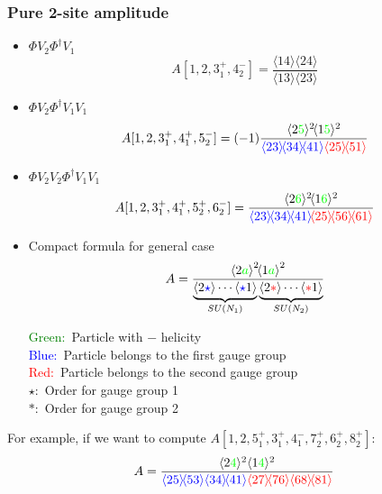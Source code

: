 \documentclass{beamer}
\newcommand{\avg}[1]{\langle #1 \rangle}
\newcommand{\mdavg}[2]{\langle #1 \rangle\!\langle #2 \rangle}
\newcommand{\asqu}[1]{{\langle#1\rangle}^2}
\begin{document}
\begin{frame}
    \frametitle{Pure 2-site amplitude}
    \begin{itemize}
        \item $\Phi V_2 \Phi^\dagger V_1$
        \begin{equation*}
            A[1,2,3_1^+,4_2^-]=\frac{\mdavg{14}{24}}{\mdavg{13}{23}}
        \end{equation*}
        \item $\Phi V_2 \Phi^\dagger V_1V_1$
        \begin{equation*}
            A[1,2,3_1^+,4_1^+,5_2^-]=(-1)\frac{\avg{2\textcolor{green}{5}}^2\!\avg{1\textcolor{green}{5}}^2}{\textcolor{blue}{\mdavg{23}{34}\!\avg{41}}\textcolor{red}{\mdavg{25}{51}}}
        \end{equation*}
        \item $\Phi V_2V_2 \Phi^\dagger V_1V_1$
        \begin{equation*}
            A[1,2,3_1^+,4_1^+,5_2^+,6_2^-]=\frac{\avg{2\textcolor{green}{6}}^2\!\avg{1\textcolor{green}{6}}^2}{\textcolor{blue}{\mdavg{23}{34}\!\avg{41}}\!\textcolor{red}{\mdavg{25}{56}\!\avg{61}}}
        \end{equation*}       
    \end{itemize}
\end{frame}

\begin{frame}
    \begin{itemize}
        \item Compact formula for general case
        \begin{equation*}
            A=\frac{\asqu{2\textcolor{green}{a}}\!\asqu{1\textcolor{green}{a}}}{\underbrace{\avg{2\textcolor{blue}{\star}}\cdots \avg{\textcolor{blue}{\star}1}}_{SU(N_1)}\underbrace{\avg{2\textcolor{red}{\ast} }\cdots \avg{\textcolor{red}{\ast} 1}}_{SU(N_2)}}
        \end{equation*} 
        \begin{minipage}{0.7\textwidth}
            \raggedright  %
            \textcolor{green}{Green:} \,Particle with $-$ helicity\\
            \textcolor{blue}{Blue:}\, Particle belongs to the first gauge group\\
            \textcolor{red}{Red:}\, Particle belongs to the second gauge group\\
            $\star$: \,Order for gauge group 1\\
            $\ast$: \,Order for gauge group 2 
            \end{minipage}
       
    \end{itemize}
    \pause
    For example, if we want to compute $A[1,2,5_1^+,3_1^+,4_1^-,7_2^+,6_2^+,8_2^+]$:
    \begin{equation*}
        A=\frac{\avg{2\textcolor{green}{4}}^2\avg{1\textcolor{green}{4}}^2}{\textcolor{blue}{\mdavg{25}{53}\mdavg{34}{41}}\textcolor{red}{\mdavg{27}{76}\mdavg{68}{81}}}
    \end{equation*}
\end{frame}
\end{document}
